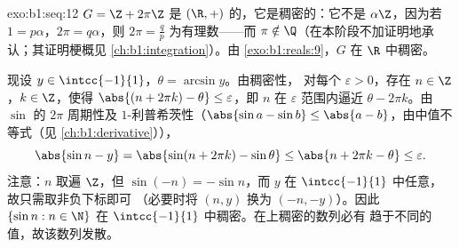 \begin{solution}{exo:b1:seq:12}
$G = \Z + 2\pi\Z$ 是 $(\R, +)$ 的，它是稠密的：它不是
$\alpha\Z$，因为若 $1 = p\alpha$，$2\pi = q\alpha$，则 $2\pi =
\frac qp$ 为有理数——而 $\pi \notin \Q$（在本阶段不加证明地承认；其证明梗概见
\cref{ch:b1:integration}）。由 \cref{exo:b1:reals:9}，$G$
在 $\R$ 中稠密。

现设 $y \in \intcc{-1}{1}$，$\theta = \arcsin y$。由稠密性，
对每个 $\varepsilon > 0$，存在 $n \in \Z$，$k \in \Z$，使得
$\abs{(n + 2\pi k) - \theta} \leq \varepsilon$，即 $n$
在 $\varepsilon$ 范围内逼近 $\theta - 2\pi k$。由 $\sin$
的 $2\pi$ 周期性及 $1$-利普希茨性（$\abs{\sin a - \sin b} \leq
\abs{a - b}$，由中值不等式（见
\cref{ch:b1:derivative}）），
\[
\abs{\sin n - y} = \abs{\sin(n + 2\pi k) - \sin\theta}
\leq \abs{n + 2\pi k - \theta} \leq \varepsilon .
\]
注意：$n$ 取遍 $\Z$，但 $\sin(-n) = -\sin n$，而 $y$
在 $\intcc{-1}{1}$ 中任意，故只需取非负下标即可
（必要时将 $(n, y)$ 换为 $(-n, -y)$）。因此 $\{\sin n : n \in
\N\}$ 在 $\intcc{-1}{1}$ 中稠密。在上稠密的数列必有
趋于不同的值，故该数列发散。
\end{solution}

